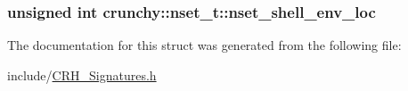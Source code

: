 \subsubsection[{nset\+\_\+shell\+\_\+env\+\_\+loc}]{\setlength{\rightskip}{0pt plus 5cm}unsigned int crunchy\+::nset\+\_\+t\+::nset\+\_\+shell\+\_\+env\+\_\+loc}\label{structcrunchy_1_1nset__t_ad915c66f77d295650d514a6804a662d2}


The documentation for this struct was generated from the following file\+:\begin{DoxyCompactItemize}
\item 
include/\hyperlink{_c_r_h___signatures_8h}{C\+R\+H\+\_\+\+Signatures.\+h}\end{DoxyCompactItemize}
